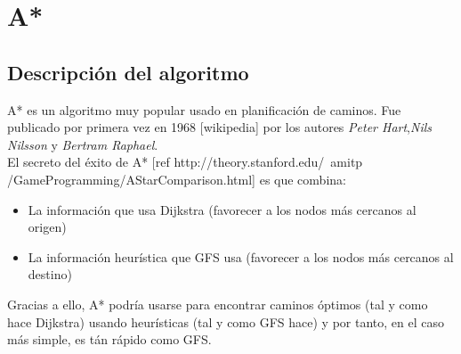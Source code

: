 \documentclass[conference]{IEEEtran}
\begin{document}
{\section{A*}

\subsection{Descripción del algoritmo}

A* es un algoritmo muy popular usado en planificación de caminos. Fue publicado por primera vez en 1968 [wikipedia] por los autores \textit{Peter Hart},\textit{Nils Nilsson} y \textit{Bertram Raphael}.\\

El secreto del éxito de A* [ref http://theory.stanford.edu/~amitp
/GameProgramming/AStarComparison.html] es que combina:
\begin{itemize}
\item La información que usa Dijkstra (favorecer a los nodos más cercanos al origen)
\item La información heurística que GFS usa (favorecer a los nodos más cercanos al destino)
\end{itemize}

Gracias a ello, A* podría usarse para encontrar caminos óptimos (tal y como hace Dijkstra) usando heurísticas (tal y como GFS hace) y por tanto, en el caso más simple, es tán rápido como GFS.\\

}
\end{document}
